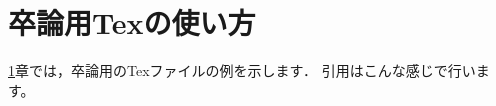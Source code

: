 \chapter{卒論用Texの使い方}
\label{ch:graduation-thesis-intro}

\ref{ch:graduation-thesis-intro}章では，卒論用のTexファイルの例を示します．
引用はこんな感じ\cite{AgricultureProblem}で行います。

